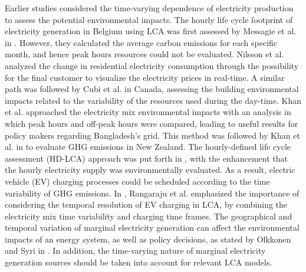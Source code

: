 Earlier studies  considered the time-varying dependence of electricity production to assess the potential environmental impacts. {The hourly life cycle footprint of electricity generation in Belgium using LCA was first assessed by Messagie et al. in \cite{MESSAGIE2014469}. However, they calculated the average carbon emissions for each specific month, and hence peak hours resources could not be evaluated.} Nilsson et al. \cite{Nilsson2017AssessingEmissions} analyzed the change in residential electricity consumption through the possibility for the final customer to visualize the electricity prices in real-time. A similar path was followed by Cubi et al. \cite{Cubi2015IncorporationAssessment} in Canada, assessing the building environmental impacts related to the variability of the resources used during the day-time. 
Khan et al. \cite{Khan2018} approached the electricity mix environmental impacts with an analysis in which peak hours and off-peak hours were compared, leading to useful results for policy makers regarding Bangladesh's grid. This method was followed by Khan et al. in \cite{Khan2018AnalysisIntensity} to evaluate GHG emissions in New Zealand. {The hourly-defined life cycle assessment (HD-LCA) approach was put forth in \cite{Baumann2019}, with the enhancement that the hourly electricity supply was environmentally evaluated. 
 As a result, electric vehicle (EV) charging processes could be scheduled according to the time variability of GHG emissions. In \cite{RANGARAJU2015496}, Rangaraju et al. emphasized the importance of considering the temporal resolution of EV charging in LCA, by combining the electricity mix time variability and charging time frames.}
{The geographical and temporal variation of marginal electricity generation can affect the environmental impacts of an energy system, as well as  policy decisions, as stated by Olkkonen and Syri in \cite{Olkkonen2016Spatial2030}. In addition, the time-varying nature of marginal electricity generation sources should be taken into account for relevant LCA models.}


